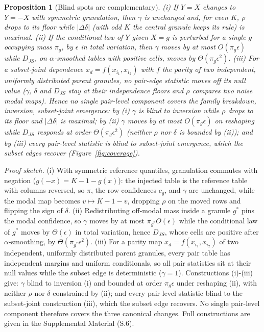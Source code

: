 \documentclass[11pt,a4paper]{article}
\newtheorem{proposition}{Proposition}
\begin{document}
\begin{proposition}[Blind spots are complementary]\label{prop:blind}
(i) If $Y=X$ changes to $Y=-X$ with symmetric granulation, then
$\gamma$ is unchanged and, for even $K$, $\rho$
drops to its floor while $|\Delta\delta|$ (with odd $K$ the
central granule keeps its rule)
is maximal. (ii) If the conditional law of $Y$ given $X=g$ is perturbed for
a single $g$ occupying mass $\pi_g$, by $\epsilon$ in total variation, then
$\gamma$ moves by at most $O(\pi_g\epsilon)$ while $D_{JS}$, on
$\alpha$-smoothed tables with positive cells, moves by
$\Theta(\pi_g\epsilon^2)$. (iii) For a subset-joint dependence
$x_d=f(x_{i_1},x_{i_2})$ with $f$ the parity of two independent, uniformly
distributed parent granules, no pair-edge statistic moves
off its null value ($\gamma$, $\delta$ and $D_{JS}$ stay at
their independence floors and $\rho$ compares two noise modal maps). Hence no single pair-level component covers the family
{breakdown, inversion, subset-joint emergence}: by (i) $\gamma$ is
blind to inversion while $\rho$ drops to its floor and $|\Delta\delta|$ is maximal; by (ii) $\gamma$ moves by at most $O(\pi_g\epsilon)$ on reshaping while $D_{JS}$ responds at order $\Theta(\pi_g\epsilon^2)$ (neither $\rho$ nor $\delta$ is bounded by (ii)); and by (iii) every
pair-level statistic is blind to subset-joint emergence, which the subset
edges recover (Figure~\ref{fig:coverage}).
\end{proposition}

\noindent\emph{Proof sketch.} (i) With symmetric reference quantiles,
granulation commutes with negation ($g(-x)=K-1-g(x)$): the injected table
is the reference table with columns reversed, so $\pi$, the row
confidences $c_g$, and $\gamma$ are unchanged, while the modal map becomes
$v\mapsto K-1-v$, dropping $\rho$ on the moved rows and flipping the sign
of $\delta$. (ii) Redistributing off-modal mass inside a granule
$g^\ast$ pins the modal confidence, so $\gamma$ moves by at most
$\pi_{g^\ast} O(\epsilon)$ while the conditional law of $g^\ast$ moves by
$\Theta(\epsilon)$ in total variation, hence $D_{JS}$, whose cells are
positive after $\alpha$-smoothing, by
$\Theta(\pi_{g^\ast}\epsilon^2)$. (iii) For a parity map
$x_d=f(x_{i_1},x_{i_2})$ of two independent, uniformly distributed parent
granules, every pair table has
independent margins and uniform conditionals, so all pair statistics sit
at their null values while the subset edge is deterministic ($\gamma=1$). Constructions (i)-(iii) give: $\gamma$ blind to inversion (i) and
bounded at order $\pi_g\epsilon$ under reshaping (ii), with neither $\rho$ nor $\delta$ constrained by (ii); and every pair-level
statistic blind to the subset-joint construction (iii), which the subset
edge recovers. No single pair-level component therefore covers the three
canonical changes.
Full constructions are given in the Supplemental Material (S.6).
\end{document}
